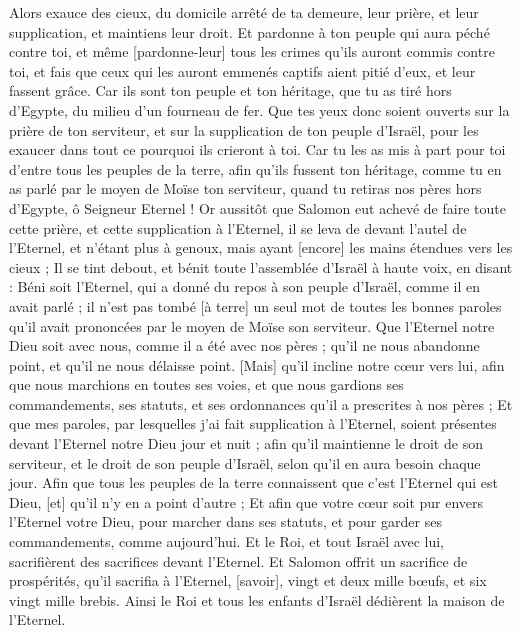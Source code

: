 \begin{multicols}{2}
Alors exauce des cieux, du domicile arrêté de ta demeure, leur prière, et leur supplication, et maintiens leur droit.
Et pardonne à ton peuple qui aura péché contre toi, et même [pardonne-leur] tous les crimes qu'ils auront commis contre toi, et fais que ceux qui les auront emmenés captifs aient pitié d'eux, et leur fassent grâce.
Car ils sont ton peuple et ton héritage, que tu as tiré hors d'Egypte, du milieu d'un fourneau de fer.
Que tes yeux donc soient ouverts sur la prière de ton serviteur, et sur la supplication de ton peuple d'Israël, pour les exaucer dans tout ce pourquoi ils crieront à toi.
Car tu les as mis à part pour toi d'entre tous les peuples de la terre, afin qu'ils fussent ton héritage, comme tu en as parlé par le moyen de Moïse ton serviteur, quand tu retiras nos pères hors d'Egypte, ô Seigneur Eternel !
Or aussitôt que Salomon eut achevé de faire toute cette prière, et cette supplication à l'Eternel, il se leva de devant l'autel de l'Eternel, et n'étant plus à genoux, mais ayant [encore] les mains étendues vers les cieux ;
Il se tint debout, et bénit toute l'assemblée d'Israël à haute voix, en disant :
Béni soit l'Eternel, qui a donné du repos à son peuple d'Israël, comme il en avait parlé ; il n'est pas tombé [à terre] un seul mot de toutes les bonnes paroles qu'il avait prononcées par le moyen de Moïse son serviteur.
Que l'Eternel notre Dieu soit avec nous, comme il a été avec nos pères ; qu'il ne nous abandonne point, et qu'il ne nous délaisse point.
[Mais] qu'il incline notre cœur vers lui, afin que nous marchions en toutes ses voies, et que nous gardions ses commandements, ses statuts, et ses ordonnances qu'il a prescrites à nos pères ;
Et que mes paroles, par lesquelles j'ai fait supplication à l'Eternel, soient présentes devant l'Eternel notre Dieu jour et nuit ; afin qu'il maintienne le droit de son serviteur, et le droit de son peuple d'Israël, selon qu'il en aura besoin chaque jour.
Afin que tous les peuples de la terre connaissent que c'est l'Eternel qui est Dieu, [et] qu'il n'y en a point d'autre ;
Et afin que votre cœur soit pur envers l'Eternel votre Dieu, pour marcher dans ses statuts, et pour garder ses commandements, comme aujourd'hui.
Et le Roi, et tout Israël avec lui, sacrifièrent des sacrifices devant l'Eternel.
Et Salomon offrit un sacrifice de prospérités, qu'il sacrifia à l'Eternel, [savoir], vingt et deux mille bœufs, et six vingt mille brebis. Ainsi le Roi et tous les enfants d'Israël dédièrent la maison de l'Eternel.

\end{multicols}
